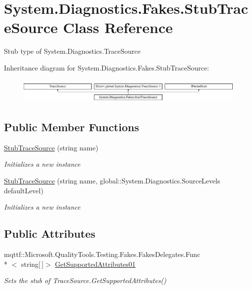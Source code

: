 \hypertarget{class_system_1_1_diagnostics_1_1_fakes_1_1_stub_trace_source}{\section{System.\-Diagnostics.\-Fakes.\-Stub\-Trace\-Source Class Reference}
\label{class_system_1_1_diagnostics_1_1_fakes_1_1_stub_trace_source}
}


Stub type of System.\-Diagnostics.\-Trace\-Source 


Inheritance diagram for System.\-Diagnostics.\-Fakes.\-Stub\-Trace\-Source\-:\begin{figure}[H]
\begin{center}
\leavevmode
\includegraphics[height=1.257015cm]{class_system_1_1_diagnostics_1_1_fakes_1_1_stub_trace_source}
\end{center}
\end{figure}
\subsection*{Public Member Functions}
\begin{DoxyCompactItemize}
\item 
\hyperlink{class_system_1_1_diagnostics_1_1_fakes_1_1_stub_trace_source_a110de9cbb7109214079704aca7da983a}{Stub\-Trace\-Source} (string name)
\begin{DoxyCompactList}\small\item\em Initializes a new instance\end{DoxyCompactList}\item 
\hyperlink{class_system_1_1_diagnostics_1_1_fakes_1_1_stub_trace_source_a1543dbe8031fa62d97225a5c89190129}{Stub\-Trace\-Source} (string name, global\-::\-System.\-Diagnostics.\-Source\-Levels default\-Level)
\begin{DoxyCompactList}\small\item\em Initializes a new instance\end{DoxyCompactList}\end{DoxyCompactItemize}
\subsection*{Public Attributes}
\begin{DoxyCompactItemize}
\item 
mqttf\-::\-Microsoft.\-Quality\-Tools.\-Testing.\-Fakes.\-Fakes\-Delegates.\-Func\\*
$<$ string\mbox{[}$\,$\mbox{]}$>$ \hyperlink{class_system_1_1_diagnostics_1_1_fakes_1_1_stub_trace_source_aa8c381d5fa17840573f5d81f55650865}{Get\-Supported\-Attributes01}
\begin{DoxyCompactList}\small\item\em Sets the stub of Trace\-Source.\-Get\-Supported\-Attributes()\end{DoxyCompactList}\end{DoxyCompactItemize}
